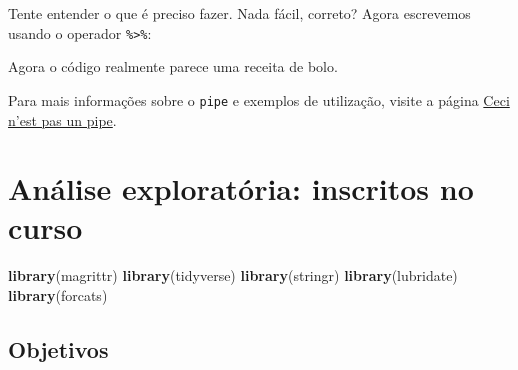 \documentclass[]{book}
\newenvironment{Shaded}{\begin{snugshade}}{\end{snugshade}}
\newcommand{\KeywordTok}[1]{\textcolor[rgb]{0.13,0.29,0.53}{\textbf{{#1}}}}
\newcommand{\DataTypeTok}[1]{\textcolor[rgb]{0.13,0.29,0.53}{{#1}}}
\newcommand{\DecValTok}[1]{\textcolor[rgb]{0.00,0.00,0.81}{{#1}}}
\newcommand{\StringTok}[1]{\textcolor[rgb]{0.31,0.60,0.02}{{#1}}}
\newcommand{\NormalTok}[1]{{#1}}
\begin{document}
Tente entender o que é preciso fazer. Nada fácil, correto? Agora
escrevemos usando o operador \texttt{\%\textgreater{}\%}:

\begin{Shaded}
\end{Shaded}

Agora o código realmente parece uma receita de bolo.

Para mais informações sobre o \texttt{pipe} e exemplos de utilização,
visite a página
\href{http://cran.r-project.org/web/packages/magrittr/vignettes/magrittr.html}{Ceci
n'est pas un pipe}.

\chapter{Análise exploratória: inscritos no curso}\label{set-up}

\begin{Shaded}
\begin{Highlighting}[]
\KeywordTok{library}\NormalTok{(magrittr)}
\KeywordTok{library}\NormalTok{(tidyverse)}
\KeywordTok{library}\NormalTok{(stringr)}
\KeywordTok{library}\NormalTok{(lubridate)}
\KeywordTok{library}\NormalTok{(forcats)}
\end{Highlighting}
\end{Shaded}

\section{Objetivos}\label{objetivos}
\end{document}
